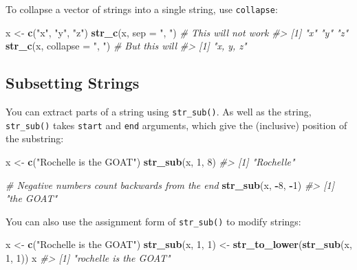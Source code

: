 \documentclass[]{book}
\newenvironment{Shaded}{\begin{snugshade}}{\end{snugshade}}
\newcommand{\KeywordTok}[1]{\textcolor[rgb]{0.13,0.29,0.53}{\textbf{#1}}}
\newcommand{\DataTypeTok}[1]{\textcolor[rgb]{0.13,0.29,0.53}{#1}}
\newcommand{\DecValTok}[1]{\textcolor[rgb]{0.00,0.00,0.81}{#1}}
\newcommand{\StringTok}[1]{\textcolor[rgb]{0.31,0.60,0.02}{#1}}
\newcommand{\CommentTok}[1]{\textcolor[rgb]{0.56,0.35,0.01}{\textit{#1}}}
\newcommand{\OperatorTok}[1]{\textcolor[rgb]{0.81,0.36,0.00}{\textbf{#1}}}
\newcommand{\NormalTok}[1]{#1}
\begin{document}
To collapse a vector of strings into a single string, use
\texttt{collapse}:

\begin{Shaded}
\begin{Highlighting}[]
\NormalTok{x <-}\StringTok{ }\KeywordTok{c}\NormalTok{(}\StringTok{"x"}\NormalTok{, }\StringTok{"y"}\NormalTok{, }\StringTok{"z"}\NormalTok{)}
\KeywordTok{str_c}\NormalTok{(x, }\DataTypeTok{sep =} \StringTok{", "}\NormalTok{) }\CommentTok{# This will not work}
\CommentTok{#> [1] "x" "y" "z"}
\KeywordTok{str_c}\NormalTok{(x, }\DataTypeTok{collapse =} \StringTok{", "}\NormalTok{) }\CommentTok{# But this will}
\CommentTok{#> [1] "x, y, z"}
\end{Highlighting}
\end{Shaded}

\subsection{Subsetting Strings}\label{subsetting-strings}

You can extract parts of a string using \texttt{str\_sub()}. As well as
the string, \texttt{str\_sub()} takes \texttt{start} and \texttt{end}
arguments, which give the (inclusive) position of the substring:

\begin{Shaded}
\begin{Highlighting}[]
\NormalTok{x <-}\StringTok{ }\KeywordTok{c}\NormalTok{(}\StringTok{"Rochelle is the GOAT"}\NormalTok{)}
\KeywordTok{str_sub}\NormalTok{(x, }\DecValTok{1}\NormalTok{, }\DecValTok{8}\NormalTok{)}
\CommentTok{#> [1] "Rochelle"}

\CommentTok{# Negative numbers count backwards from the end}
\KeywordTok{str_sub}\NormalTok{(x, }\OperatorTok{-}\DecValTok{8}\NormalTok{, }\OperatorTok{-}\DecValTok{1}\NormalTok{)}
\CommentTok{#> [1] "the GOAT"}
\end{Highlighting}
\end{Shaded}

You can also use the assignment form of \texttt{str\_sub()} to modify
strings:

\begin{Shaded}
\begin{Highlighting}[]
\NormalTok{x <-}\StringTok{ }\KeywordTok{c}\NormalTok{(}\StringTok{"Rochelle is the GOAT"}\NormalTok{)}
\KeywordTok{str_sub}\NormalTok{(x, }\DecValTok{1}\NormalTok{, }\DecValTok{1}\NormalTok{) <-}\StringTok{ }\KeywordTok{str_to_lower}\NormalTok{(}\KeywordTok{str_sub}\NormalTok{(x, }\DecValTok{1}\NormalTok{, }\DecValTok{1}\NormalTok{))}
\NormalTok{x}
\CommentTok{#> [1] "rochelle is the GOAT"}
\end{Highlighting}
\end{Shaded}
\end{document}
